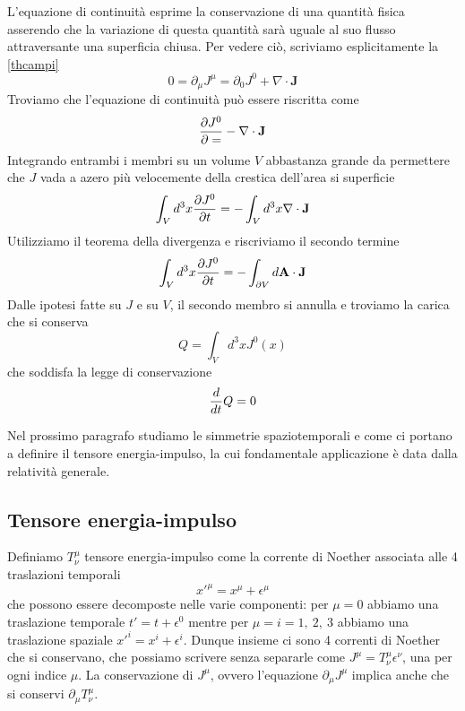     L'equazione di continuità esprime la conservazione di una quantità fisica asserendo che la variazione di questa quantità sarà uguale al suo flusso attraversante una superficia chiusa. Per vedere ciò, scriviamo esplicitamente la \eqref{thcampi}
\begin{equation}
    0 = \partial_\mu J^\mu = \partial_0 J^0 + \nabla \cdot \mathbf J
\end{equation}
    Troviamo che l'equazione di continuità può essere riscritta come 
\begin{equation*}
    \frac{\partial J^0}{\partial=} - \nabla \cdot \mathbf J
\end{equation*}
    Integrando entrambi i membri su un volume $V$ abbastanza grande da permettere che $J$ vada a azero più velocemente della crestica dell'area si superficie
\begin{equation*}
    \int_V d^3 x \frac{\partial J^0}{\partial t} = - \int_V d^3 x \nabla \cdot \mathbf J
\end{equation*} 
    Utilizziamo il teorema della divergenza e riscriviamo il secondo termine 
\begin{equation*}
    \int_V d^3 x \frac{\partial J^0}{\partial t} = - \int_{\partial V} d \mathbf A \cdot \mathbf J
\end{equation*} 
    Dalle ipotesi fatte su $J$ e su $V$, il secondo membro si annulla e troviamo la carica che si conserva 
\begin{equation*}
    Q = \int_V d^3 x J^0(x)
\end{equation*} 
    che soddisfa la legge di conservazione
\begin{equation*}
    \frac{d}{dt} Q = 0 
\end{equation*}

    Nel prossimo paragrafo studiamo le simmetrie spaziotemporali e come ci portano a definire il tensore energia-impulso, la cui fondamentale applicazione è data dalla relatività generale. 

\subsection{Tensore energia-impulso}
    Definiamo $T^\mu_\nu$ tensore energia-impulso come la corrente di Noether associata alle 4 traslazioni temporali
\begin{equation}
    x'^\mu = x^\mu + \epsilon^\mu
\end{equation}
    che possono essere decomposte nelle varie componenti: per $\mu=0$ abbiamo una traslazione temporale $t' = t + \epsilon^0$ mentre per $\mu=i=1,~2,~3$ abbiamo una traslazione spaziale $x'^i = x^i + \epsilon^i$. Dunque insieme ci sono 4 correnti di Noether che si conservano, che possiamo scrivere senza separarle come $J^\mu = T^\mu_\nu \epsilon^\nu$, una per ogni indice $\mu$. La conservazione di $J^\mu$, ovvero l'equazione $\partial_\mu J^\mu$ implica anche che si conservi  $\partial_\mu T^\mu_\nu$.

